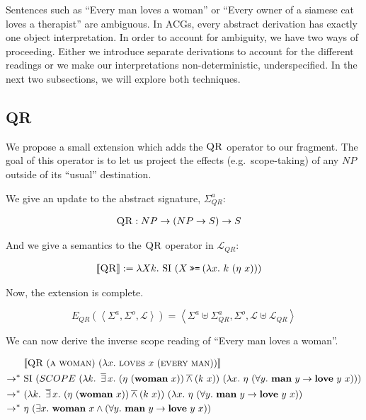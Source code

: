 \documentclass{article}
\newcommand{\hsbind}{\mathbin{\texttt{>>=}}}
\newcommand{\abs}[1]{\textsc{#1}}
\newcommand{\obj}[1]{\textbf{#1}}
\newcommand{\sem}[1]{\llbracket #1 \rrbracket}
\newcommand{\lex}[2]{\sem{\abs{#1}} &:= #2}
\newcommand{\dand}{\mathbin{\overline{\land}}}
\newcommand{\dexists}{\mathop{\overline{\exists}}}
\begin{document}
Sentences such as ``Every man loves a woman'' or ``Every owner of a siamese
cat loves a therapist'' are ambiguous. In ACGs, every abstract derivation
has exactly one object interpretation. In order to account for ambiguity,
we have two ways of proceeding. Either we introduce separate derivations to
account for the different readings or we make our interpretations
non-deterministic, underspecified. In the next two subsections, we will
explore both techniques.

\subsection{QR}

We propose a small extension which adds the $\abs{QR}$ operator to our
fragment. The goal of this operator is to let us project the effects
(e.g.\ scope-taking) of any $NP$ outside of its ``usual'' destination.

We give an update to the abstract signature, $\Sigma^a_{QR}$:

\begin{align*}
  \abs{QR} &: NP \to (NP \to S) \to S
\end{align*}

And we give a semantics to the $\abs{QR}$ operator in $\mathcal{L}_{QR}$:

\begin{align*}
  \lex{QR}{\lambda X k.\ \mathrm{SI}\ (X \hsbind (\lambda x.\ k\ (\eta\ x)))}
\end{align*}

Now, the extension is complete.

$$
E_{QR}(\left< \Sigma^a, \Sigma^o, \mathcal{L} \right>) = \left< \Sigma^a \uplus \Sigma^a_{QR}, \Sigma^o, \mathcal{L} \uplus \mathcal{L}_{QR} \right>
$$

We can now derive the inverse scope reading of ``Every man loves a woman''.

\begin{align*}
& \sem{\abs{QR}\ (\abs{a}\ \abs{woman})\ (\lambda
    x.\ \abs{loves}\ x\ (\abs{every}\ \abs{man}))} \\
\rightarrow^*\ & \mathrm{SI}\ (SCOPE\ (\lambda k.\ \dexists
x.\ (\eta\ (\obj{woman}\ x)) \dand (k\ x))\ (\lambda x.\ \eta\ (\forall
y.\ \obj{man}\ y \rightarrow \obj{love}\ y\ x))) \\
\rightarrow^*\ & (\lambda k.\ \dexists
x.\ (\eta\ (\obj{woman}\ x)) \dand (k\ x))\ (\lambda x.\ \eta\ (\forall
y.\ \obj{man}\ y \rightarrow \obj{love}\ y\ x)) \\
\rightarrow^*\ & \eta\ (\exists x.\ \obj{woman}\ x \land (\forall
y.\ \obj{man}\ y \rightarrow \obj{love}\ y\ x))
\end{align*}
\end{document}
